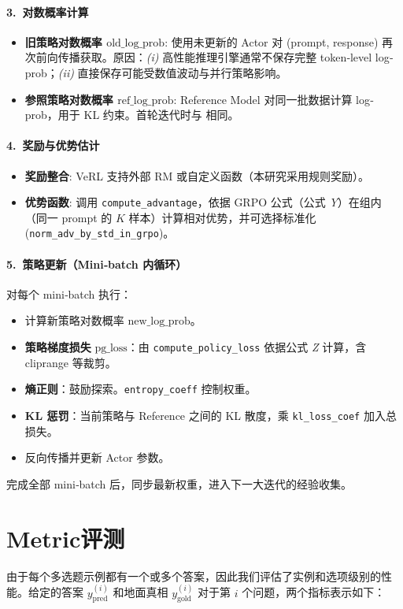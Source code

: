 \documentclass{pkuthesis}
\begin{document}
\paragraph{3.\ 对数概率计算}
\begin{itemize}
    \item \textbf{旧策略对数概率 $\text{old\_log\_prob}$}: 使用未更新的 Actor 对 (prompt, response) 再次前向传播获取。原因：\textit{(i)} 高性能推理引擎通常不保存完整 token‐level log‐prob；\textit{(ii)} 直接保存可能受数值波动与并行策略影响。
    \item \textbf{参照策略对数概率 $\text{ref\_log\_prob}$}: Reference Model 对同一批数据计算 log‐prob，用于 KL 约束。首轮迭代时与  相同。
\end{itemize}

\paragraph{4.\ 奖励与优势估计}
\begin{itemize}
    \item \textbf{奖励整合}: VeRL 支持外部 RM 或自定义函数（本研究采用规则奖励）。
    \item \textbf{优势函数}: 调用 \texttt{compute\_advantage}，依据 GRPO 公式（公式 \textit{Y}）在组内（同一 prompt 的 $K$ 样本）计算相对优势，并可选择标准化 (\texttt{norm\_adv\_by\_std\_in\_grpo})。
\end{itemize}

\paragraph{5.\ 策略更新（Mini‐batch 内循环）}
对每个 mini‐batch 执行：
\begin{itemize}
    \item 计算新策略对数概率 $\text{new\_log\_prob}$。
    \item \textbf{策略梯度损失} $\text{pg\_loss}$：由 \texttt{compute\_policy\_loss} 依据公式 \textit{Z} 计算，含 cliprange 等裁剪。
    \item \textbf{熵正则}：鼓励探索。\texttt{entropy\_coeff} 控制权重。
    \item \textbf{KL 惩罚}：当前策略与 Reference 之间的 KL 散度，乘 \texttt{kl\_loss\_coef} 加入总损失。
    \item 反向传播并更新 Actor 参数。
\end{itemize}
完成全部 mini‐batch 后，同步最新权重，进入下一大迭代的经验收集。


\section{Metric评测}
由于每个多选题示例都有一个或多个答案，因此我们评估了实例和选项级别的性能。给定的答案 $y^{(i)}_{\text{pred}}$ 和地面真相 $y^{(i)}_{\text{gold}}$ 对于第 $i$ 个问题，两个指标表示如下：
\end{document}
